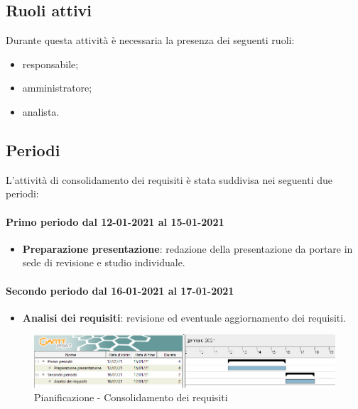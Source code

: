 \subsection{Ruoli attivi} 
Durante questa attività è necessaria la presenza dei seguenti ruoli: 
\begin{itemize} 
	\item responsabile; 
	\item amministratore; 
	\item analista. 
\end{itemize} 

\subsection{Periodi} 
L'attività di consolidamento dei requisiti è stata suddivisa nei seguenti due periodi: 

\paragraph{Primo periodo dal 12-01-2021 al 15-01-2021} 
\begin{itemize} 
	
	\item \textbf{Preparazione presentazione}: redazione della presentazione da portare in sede di revisione e studio individuale. 
	
\end{itemize}	 

\paragraph{Secondo periodo dal 16-01-2021 al 17-01-2021} 
\begin{itemize} 
	
	\item \textbf{Analisi dei requisiti}: revisione ed eventuale aggiornamento dei requisiti. 
	
\end{itemize} 

\newpage 

\begin{landscape} 
	\begin{figure}[h!] 
		\includegraphics[width=24cm]{images/2_Consolidamento_dei_requisiti.png} 
		\caption{Pianificazione - Consolidamento dei requisiti} 
	\end{figure} 
\end{landscape} 

